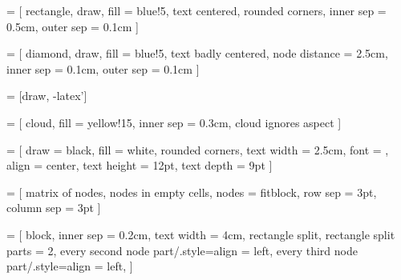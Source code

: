 
\setcounter{secnumdepth}{2}


\newenvironment{ctable}[2] {
\begin{table}[htbp]
  \caption{#1}
  \begin{center}
    \begin{tabular}{#2}
}
{
    \end{tabular}
  \end{center}
\end{table}
}


\usepackage{tikz}
\usepackage{pgfplots}
\usepackage{pgfplotstable}
\usepackage{tikzscale}
\usetikzlibrary{shapes, arrows, calc, positioning, fit, matrix, er}

 = [
    rectangle,
    draw,
    fill = blue!5,
    text centered,
    rounded corners,
    inner sep = 0.5cm,
    outer sep = 0.1cm
]

 = [
    diamond,
    draw,
    fill = blue!5,
    text badly centered,
    node distance = 2.5cm,
    inner sep = 0.1cm,
    outer sep = 0.1cm
]

 = [draw, -latex']

 = [
    cloud,
    fill = yellow!15,
    inner sep = 0.3cm,
    cloud ignores aspect
]

 = [
    draw = black,
    fill = white,
    rounded corners,
    text width = 2.5cm,
    font = {\sffamily\bfseries\color{black}},
    align = center,
    text height = 12pt,
    text depth = 9pt
]

 = [
    matrix of nodes,
    nodes in empty cells,
    nodes = {fitblock},
    row sep = 3pt,
    column sep = 3pt
]

 = [
    block,
    inner sep = 0.2cm,
    text width = 4cm,
    rectangle split,
    rectangle split parts = 2,
    every second node part/.style={align = left},
    every third node part/.style={align = left},
]


\newcommand{\spanblock}[3]{
    \node[
        fitblock,
        inner sep = 0pt,
        fit = {(#1) (#2)},
        label = center:{\sffamily\bfseries\color{black}#3}
    ] {};
}

